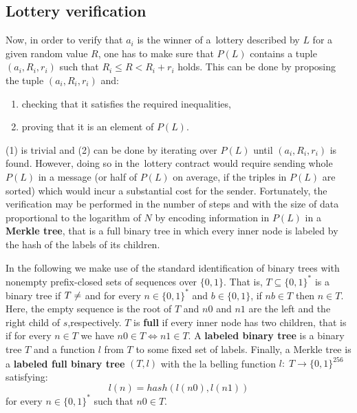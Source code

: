 \documentclass[a4paper]{article}
\begin{document}
\subsection{Lottery verification}
    \label{sec:lottery-verification}
    Now, in order to verify that $a_i$ is the winner of a~lottery described by $L$ for a given random value $R$,
    one has to make sure that $P(L)$ contains a tuple $(a_i, R_i, r_i)$ such that $R_i \leq R < R_i + r_i$ holds.
    This can be done by proposing the tuple $(a_i, R_i, r_i)$ and:
    \begin{enumerate}
        \item checking that it satisfies the required inequalities,
        \item proving that it is an element of $P(L)$.
    \end{enumerate}

    (1) is trivial and (2) can be done by iterating over $P(L)$ until $(a_i, R_i, r_i)$ is found. However,
    doing so in the~lottery contract would require sending whole $P(L)$ in a message (or half of $P(L)$ on average,
    if the triples in $P(L)$ are sorted) which would incur a substantial cost for the sender. Fortunately,
    the verification may be performed in the number of steps and with the size of data proportional to the logarithm
    of $N$ by encoding information in $P(L)$ in a \textbf{Merkle tree}, that is a full binary tree in which every inner node
    is labeled by the hash of the labels of its children.

    In the following we make use of the standard identification of binary trees with nonempty prefix-closed sets
    of sequences over $\{0,1\}$. That is, $T \subseteq \{0,1\}^*$ is a binary tree if $T \neq \empty$ and for every
    $n \in \{0,1\}^*$ and $b \in \{0,1\}$, if $nb \in T$ then $n \in T$. Here, the empty sequence is the
    root of $T$ and $n0$ and $n1$ are the left and the right child of $s$,respectively.
    $T$ is \textbf{full} if every inner node has two children, that is if for every $n \in T$ we have $n0 \in T \iff n1 \in T$.
    A \textbf{labeled binary tree} is a binary tree $T$ and a function $l$ from $T$ to some fixed set of labels.
    Finally, a Merkle tree is a \textbf{labeled full binary tree} $(T, l)$ with the la belling function
    $l:\; T \rightarrow \{0,1\}^{256}$ satisfying:
    \begin{displaymath}
        l(n) = hash(l(n0), l(n1))
    \end{displaymath}
    for every $n \in \{0,1\}^*$ such that $n0 \in T$.
\end{document}
